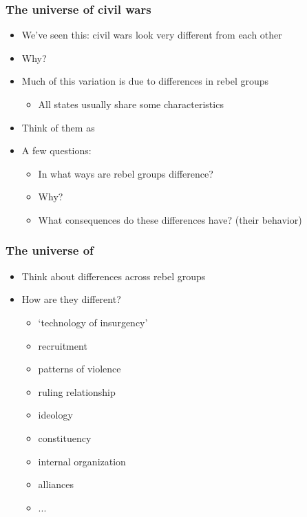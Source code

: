 \documentclass[aspectratio=43]{beamer}
\begin{document}
  

\begin{frame}
\frametitle{The universe of civil wars}
\centering

\begin{itemize}
  \item We've seen this: civil wars look very different from each other
  \item Why?
  \item Much of this variation is due to differences in rebel groups
  \begin{itemize}
    \item All states usually share some characteristics
  \end{itemize}
  \item<2-> Think of them as 
  \item<2-> A few questions:
  \begin{itemize}
    \item<3->[1.] In what ways are rebel groups difference?
    \item<3->[2.] Why?
    \item<3->[3.] What consequences do these differences have? (their behavior)
  \end{itemize}
\end{itemize}

\end{frame}

\begin{frame}
\frametitle{The universe of }
\centering

\begin{itemize}
  \item Think about differences across rebel groups
  \item How are they different?
  \begin{itemize}
    \item<2-> `technology of insurgency'
    \item<3-> recruitment
    \item<4-> patterns of violence
    \item<5-> ruling relationship
    \item<6-> ideology
    \item<7-> constituency
    \item<8-> internal organization
    \item<9-> alliances
    \item<10-> ...
  \end{itemize}
\end{itemize}

\end{frame}
\end{document}
